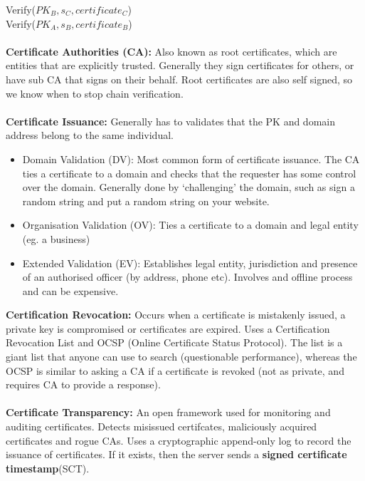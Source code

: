 \documentclass[a4paper,10pt]{article}
\begin{document}
\indent Verify($PK_{B}, s_{C}, certificate_{C}$)\\
\indent Verify($PK_{A}, s_{B}, certificate_{B}$)\\\\
\textcolor{RoyalPurple}{\textbf{Certificate Authorities (CA):}} Also known as root certificates, which are entities that are explicitly trusted. Generally they sign certificates for others, or have sub CA that signs on their behalf. Root certificates are also self signed, so we know when to stop chain verification. \\\\ 
\textcolor{RoyalPurple}{\textbf{Certificate Issuance:}} Generally has to validates that the PK and domain address belong to the same individual.
\begin{itemize}
\item \textcolor{RoyalPurple}{Domain Validation (DV):} Most common form of certificate issuance. The CA ties a certificate to a domain and checks that the requester has some control over the domain. Generally done by `challenging' the domain, such as sign a random string and put a random string on your website. 
\item \textcolor{RoyalPurple}{Organisation Validation (OV):} Ties a certificate to a domain and legal entity (eg. a business)
\item \textcolor{RoyalPurple}{Extended Validation (EV):} Establishes legal entity, jurisdiction and presence of an authorised officer (by address, phone etc). Involves and offline process and can be expensive. 	
\end{itemize}
\textcolor{RoyalPurple}{\textbf{Certification Revocation:}} Occurs when a certificate is mistakenly issued, a private key is compromised or certificates are expired. Uses a Certification Revocation List and OCSP (Online Certificate Status Protocol). The list is a giant list that anyone can use to search (questionable performance), whereas the OCSP is similar to asking a CA if a certificate is revoked (not as private, and requires CA to provide a response).\\\\ 
\textcolor{RoyalPurple}{\textbf{Certificate Transparency:}} An open framework used for monitoring and auditing certificates. Detects misissued certifcates, maliciously acquired certificates and rogue CAs. Uses a cryptographic append-only log to record the issuance of certificates. If it exists, then the server sends a \textbf{signed certificate timestamp}(SCT). 
\newpage
\end{document}

